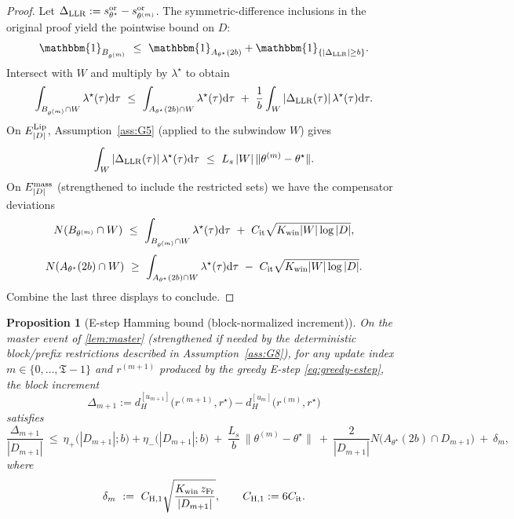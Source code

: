 \documentclass{statsoc}
\newtheorem{proposition}[proposition]{Proposition}
\newcommand{\dd}{\mathrm{d}}
\newcommand{\1}{\mathbbm{1}}
\newcommand{\Tmax}{\mathfrak{T}}
\begin{document}
\begin{proof}
Let $\Delta_{\rm LLR}:=s_{\theta^\star}^{\rm or}-s_{\theta^{(m)}}^{\rm or}$.
The symmetric-difference inclusions in the original proof yield the pointwise bound on $D$:
\[
\1_{B_{\theta^{(m)}}}
\ \le\ 
\1_{A_{\theta^\star}(2b)} + \1_{\{|\Delta_{\rm LLR}|\ge b\}}.
\]
Intersect with $W$ and multiply by $\lambda^\star$ to obtain
\[
\int_{B_{\theta^{(m)}}\cap W}\lambda^\star(\tau)\dd\tau
\ \le\ 
\int_{A_{\theta^\star}(2b)\cap W}\lambda^\star(\tau)\dd\tau
\ +\ 
\frac{1}{b}\int_W |\Delta_{\rm LLR}(\tau)|\,\lambda^\star(\tau)\dd\tau.
\]
On $E^{\rm Lip}_{|D|}$, Assumption~\ref{ass:G5} (applied to the subwindow $W$) gives
\[
\int_W |\Delta_{\rm LLR}(\tau)|\,\lambda^\star(\tau)\dd\tau
\ \le\ 
L_s\,|W|\,\|\theta^{(m)}-\theta^\star\|.
\]
On $E^{\rm mass}_{|D|}$ (strengthened to include the restricted sets) we have the compensator deviations
\[
N(B_{\theta^{(m)}}\cap W)\ \le\ \int_{B_{\theta^{(m)}}\cap W}\lambda^\star(\tau)\dd\tau\ +\ C_{\rm it}\sqrt{K_{\rm win}|W|\log|D|},
\]
\[
N(A_{\theta^\star}(2b)\cap W)\ \ge\ \int_{A_{\theta^\star}(2b)\cap W}\lambda^\star(\tau)\dd\tau\ -\ C_{\rm it}\sqrt{K_{\rm win}|W|\log|D|}.
\]
Combine the last three displays to conclude.
\end{proof}



\begin{proposition}[E-step Hamming bound (block-normalized increment)]\label{prop:Estep}
On the master event of \cref{lem:master} (strengthened if needed by the deterministic block/prefix restrictions
described in Assumption~\ref{ass:G8}), for any update index $m\in\{0,\dots,\Tmax-1\}$ and
$r^{(m+1)}$ produced by the greedy E-step \eqref{eq:greedy-estep}, the block increment
\[
\Delta_{m+1}
:=d_H^{[u_{m+1}]}\!\big(r^{(m+1)},r^\star\big)-d_H^{[u_m]}\!\big(r^{(m)},r^\star\big)
\]
satisfies
\[
\frac{\Delta_{m+1}}{|D_{m+1}|}
\ \le\ \eta_+\big(|D_{m+1}|;b\big) + \eta_-\big(|D_{m+1}|;b\big)
\ +\ \frac{L_s}{b}\,\|\theta^{(m)}-\theta^\star\|
\ +\ \frac{2}{|D_{m+1}|}N\!\big(A_{\theta^\star}(2b)\cap D_{m+1}\big)\ +\ \delta_m,
\]
where
\[
\delta_m\ :=\ C_{\rm H,1}\sqrt{\frac{K_{\rm win}\,z_{\rm Fr}}{|D_{m+1}|}},
\qquad C_{\rm H,1}:=6C_{\rm it}.
\]
\end{proposition}
\end{document}
